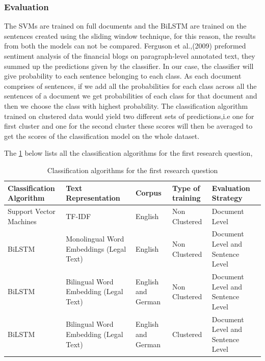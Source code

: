 \subsubsection*{Evaluation} \label{evaluationQuestionOne}
The \glspl{SVM} are trained on full documents and the \gls{BiLSTM} are trained on the sentences created using the  sliding window technique, for this reason, the results from both the models can not be compared. Ferguson et al.,(2009) \cite{ferguson2009exploring} preformed sentiment analysis of the financial blogs on paragraph-level 
annotated text, they summed up the predictions given by the classifier. In our case, the classifier will give probability to each sentence belonging to each class. As each document comprises of sentences, if we add all the probabilities for each class across all the sentences of a document we get probabilities of each class for that document and then we choose the class with highest probability. The classification algorithm trained on clustered data would yield two different sets of predictions,i.e one for first cluster and one for the second cluster these scores will then be averaged to get the scores of the classification model on the whole dataset.

The \ref{table:ListQuestionFirstQuestion} below lists all the classification algorithms for the first research question,

\clearpage

\begin{table}[!ht]
\centering
\begin{tabular}{>{\centering\arraybackslash}m{3cm}>{\centering\arraybackslash}m{3cm}>{\centering\arraybackslash}m{1.5cm}>{\centering\arraybackslash}m{2.3cm}>{\centering\arraybackslash}m{3cm}}
\hline
\textbf{Classification Algorithm} & \textbf{Text Representation} & \textbf{Corpus} & \textbf{Type of training} & \textbf{Evaluation Strategy} \\ [0.2cm]\hline
Support Vector Machines & \gls{TF-IDF} & English & Non Clustered & Document Level \\[0.3cm]
\gls{BiLSTM} & Monolingual Word Embeddings (Legal Text) & English & Non Clustered & Document Level and Sentence Level \\[0.3cm]
\gls{BiLSTM} & Bilingual Word Embedding (Legal Text) & English and German & Non Clustered & Document Level and Sentence Level \\[0.3cm]
\gls{BiLSTM} & Bilingual Word Embedding (Legal Text) & English and German & Clustered & Document Level and Sentence Level \\ \hline
\end{tabular}
\caption{Classification algorithms for the first research question}
\label{table:ListQuestionFirstQuestion}
\end{table}



